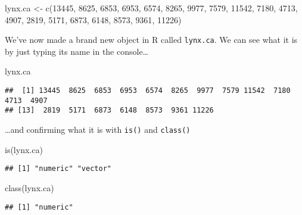 \documentclass[
]{book}
\newenvironment{Shaded}{\begin{snugshade}}{\end{snugshade}}
\newcommand{\DecValTok}[1]{\textcolor[rgb]{0.00,0.00,0.81}{#1}}
\newcommand{\FunctionTok}[1]{\textcolor[rgb]{0.00,0.00,0.00}{#1}}
\newcommand{\NormalTok}[1]{#1}
\newcommand{\OtherTok}[1]{\textcolor[rgb]{0.56,0.35,0.01}{#1}}
\begin{document}
\begin{Shaded}
\begin{Highlighting}[]
\NormalTok{lynx.ca }\OtherTok{\textless{}{-}} \FunctionTok{c}\NormalTok{(}\DecValTok{13445}\NormalTok{, }\DecValTok{8625}\NormalTok{, }\DecValTok{6853}\NormalTok{, }\DecValTok{6953}\NormalTok{, }\DecValTok{6574}\NormalTok{,}
  \DecValTok{8265}\NormalTok{, }\DecValTok{9977}\NormalTok{, }\DecValTok{7579}\NormalTok{, }\DecValTok{11542}\NormalTok{, }\DecValTok{7180}\NormalTok{,}
  \DecValTok{4713}\NormalTok{, }\DecValTok{4907}\NormalTok{, }\DecValTok{2819}\NormalTok{, }\DecValTok{5171}\NormalTok{, }\DecValTok{6873}\NormalTok{, }
  \DecValTok{6148}\NormalTok{, }\DecValTok{8573}\NormalTok{, }\DecValTok{9361}\NormalTok{, }\DecValTok{11226}\NormalTok{)}
\end{Highlighting}
\end{Shaded}

We've now made a brand new object in R called \texttt{lynx.ca}. We can see what it is by just typing its name in the console\ldots{}

\begin{Shaded}
\begin{Highlighting}[]
\NormalTok{lynx.ca}
\end{Highlighting}
\end{Shaded}

\begin{verbatim}
##  [1] 13445  8625  6853  6953  6574  8265  9977  7579 11542  7180  4713  4907
## [13]  2819  5171  6873  6148  8573  9361 11226
\end{verbatim}

\ldots and confirming what it is with \texttt{is()} and \texttt{class()}

\begin{Shaded}
\begin{Highlighting}[]
\FunctionTok{is}\NormalTok{(lynx.ca)}
\end{Highlighting}
\end{Shaded}

\begin{verbatim}
## [1] "numeric" "vector"
\end{verbatim}

\begin{Shaded}
\begin{Highlighting}[]
\FunctionTok{class}\NormalTok{(lynx.ca)}
\end{Highlighting}
\end{Shaded}

\begin{verbatim}
## [1] "numeric"
\end{verbatim}
\end{document}
